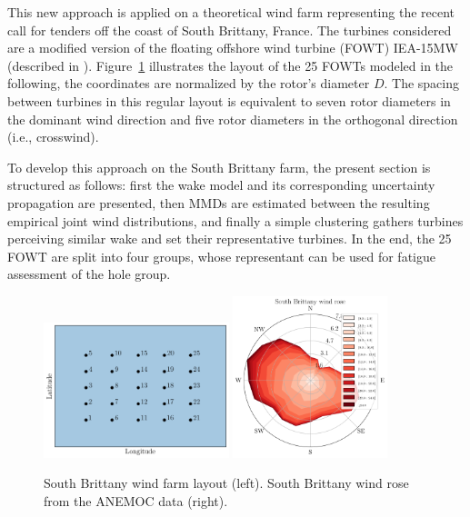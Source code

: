 This new approach is applied on a theoretical wind farm representing the recent call for tenders off the coast of South Brittany, France. 
The turbines considered are a modified version of the floating offshore wind turbine (FOWT) IEA-15MW (described in \citealp{kim_natarajan_2022}). 
Figure~\ref{fig:SB-farm} illustrates the layout of the 25 FOWTs modeled in the following, the coordinates are normalized by the rotor's diameter $D$. 
The spacing between turbines in this regular layout is equivalent to seven rotor diameters in the dominant wind direction and five rotor diameters in the orthogonal direction (i.e., crosswind). 

To develop this approach on the South Brittany farm, the present section is structured as follows: 
first the wake model and its corresponding uncertainty propagation are presented, 
then MMDs are estimated between the resulting empirical joint wind distributions, 
and finally a simple clustering gathers turbines perceiving similar wake and set their representative turbines. 
In the end, the 25 FOWT are split into four groups, whose representant can be used for fatigue assessment of the hole group. 

\begin{figure}
    \centering
    \includegraphics[width=0.48\textwidth]{part2/figures/WAKE/layout_SB.png}
    \includegraphics[width=0.4\textwidth]{../numerical_experiments/chapter3/figures/SB_wind_rose.png}
    \caption{South Brittany wind farm layout  (left). South Brittany wind rose from the ANEMOC data (right).}
    \label{fig:SB-farm}
\end{figure}


